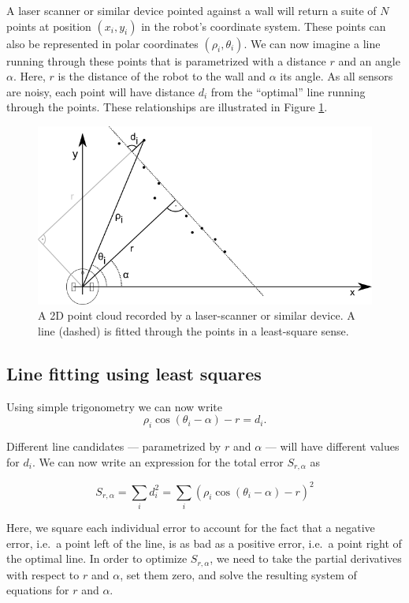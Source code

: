 A laser scanner or similar device pointed against a wall will return a suite of $N$ points at position $(x_i,y_i)$ in the robot's coordinate system. These points can also be represented in polar coordinates $ (\rho_i,\theta_i)$. We can now imagine a line running through these points that is parametrized with a distance $r$ and an angle $\alpha$. Here, $r$ is the distance of the robot to the wall and $ \alpha$ its angle. As all sensors are noisy, each point will have distance $d_i$ from the ``optimal'' line running through the points. These relationships are illustrated in Figure \ref{fig:linefitting}.
\begin{figure}
	\centering
		\includegraphics[width=\textwidth]{figs/linefitting.png}
	\caption{A 2D point cloud recorded by a laser-scanner or similar device. A line (dashed) is fitted through the points in a least-square sense.}
	\label{fig:linefitting}
\end{figure}

\subsection{Line fitting using least squares}
Using simple trigonometry we can now write
\begin{equation}
\rho_i \cos(\theta_i-\alpha)-r=d_i.
\end{equation}

Different line candidates --- parametrized by $ r$ and $ \alpha$ --- will have different values for $ d_i$. We can now write an expression for the total error $ S_{r,\alpha}$ as

\begin{equation}
S_{r,\alpha}=\sum_i{d_i^2}=\sum_i(\rho_i \cos(\theta_i-\alpha)-r)^2
\end{equation}

Here, we square each individual error to account for the fact that a negative error, i.e.\ a point left of the line, is as bad as a positive error, i.e.\ a point right of the optimal line. In order to optimize $ S_{r,\alpha}$, we need to take the partial derivatives with respect to $ r$ and $ \alpha$, set them zero, and solve the resulting system of equations for $ r$ and $ \alpha$.

